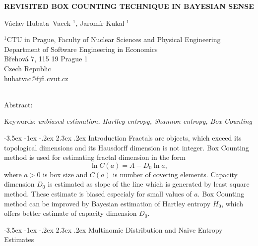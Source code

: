 \documentclass[a4paper,10pt]{article}
\makeatletter
\renewcommand\section{\@startsection {section}{1}{\z@}%
                                   {-3.5ex \@plus -1ex \@minus -.2ex}%
                                   {2.3ex \@plus.2ex}%
                                   {\large\bfseries}}
\makeatother
\begin{document}
\pagestyle{empty}

\begin{center}
{\bf \Large REVISITED BOX COUNTING TECHNIQUE IN BAYESIAN SENSE}
\end{center}

\smallskip
\begin{center}
{\large V\'{a}clav Hubata--Vacek $^1$, Jarom\'{i}r Kukal $^1$}
\end{center}

\smallskip
\begin{center}
$^1$CTU in Prague, Faculty of Nuclear Sciences and Physical Engineering\\
Department of Software Engineering in Economics\\
B\v{r}ehov\'{a} 7, 115 19 Prague 1 \\
Czech Republic\\
hubatvac@fjfi.cvut.cz\\
 ~\\

\end{center}

\bigskip
\noindent Abstract: \textit{}

\vspace*{10pt} \noindent Keywords: \textit{unbiased estimation, Hartley entropy, Shannon entropy, Box Counting}


\bigskip
\section {Introduction }
Fractals are objects, which exceed its topological dimensions and its Hausdorff dimension is not integer. Box Counting method is used for estimating fractal dimension in the form
\begin{equation} 
\label{eq:boxcount}
\ln{C(a)} = A - D_{0}\ln{a},
\end{equation}
where $a>0$ is box size and $C(a)$ is number of covering elements. Capacity dimension $D_{0}$ is estimated as slope of the line which is generated by least square method. These estimate is biased especialy for small values of $a$. Box Counting method can be improved by Bayesian estimation of Hartley entropy $H_{0}$, which offers better estimate of capacity dimension $D_{0}$.

\section {Multinomic Distribution and Naive Entropy Estimates}
\end{document}
